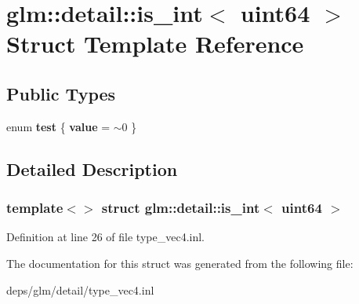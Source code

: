 \hypertarget{structglm_1_1detail_1_1is__int_3_01uint64_01_4}{}\section{glm\+:\+:detail\+:\+:is\+\_\+int$<$ uint64 $>$ Struct Template Reference}
\label{structglm_1_1detail_1_1is__int_3_01uint64_01_4}
\subsection*{Public Types}
\begin{DoxyCompactItemize}
\item 
\mbox{\label{structglm_1_1detail_1_1is__int_3_01uint64_01_4_a8be9e204582a6cf6049dac4a685cb868}} 
enum {\bfseries test} \{ {\bfseries value} = $\sim$0
 \}
\end{DoxyCompactItemize}


\subsection{Detailed Description}
\subsubsection*{template$<$$>$\newline
struct glm\+::detail\+::is\+\_\+int$<$ uint64 $>$}



Definition at line 26 of file type\+\_\+vec4.\+inl.



The documentation for this struct was generated from the following file\+:\begin{DoxyCompactItemize}
\item 
deps/glm/detail/type\+\_\+vec4.\+inl\end{DoxyCompactItemize}
